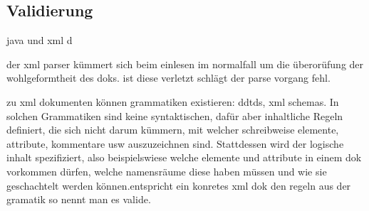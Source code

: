 




\subsection{Validierung}

java und xml d

der xml parser kümmert sich beim einlesen im normalfall um die überorüfung der wohlgeformtheit des doks. ist diese verletzt schlägt der parse vorgang fehl.

zu xml dokumenten können grammatiken existieren: ddtds, xml schemas. In solchen Grammatiken sind keine syntaktischen, dafür aber inhaltliche Regeln definiert, die sich nicht darum kümmern, mit welcher schreibweise elemente, attribute, kommentare usw auszuzeichnen sind. Stattdessen wird der logische inhalt spezifiziert, also beispielswiese welche elemente und attribute in einem dok vorkommen dürfen, welche namensräume diese haben müssen und wie sie geschachtelt werden können.entspricht ein konretes xml dok den regeln aus der gramatik so nennt man es valide. 

